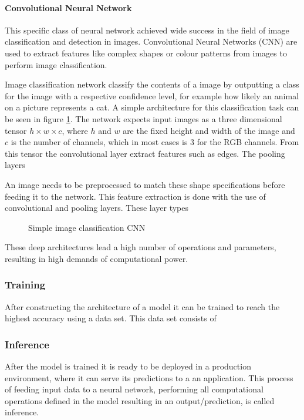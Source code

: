 \paragraph{Convolutional Neural Network}
This specific class of neural network achieved wide success in the field of image classification and detection in images. Convolutional Neural Networks (CNN) are used to extract features like complex shapes or colour patterns from images to perform image classification. 

Image classification network classify the contents of a image by outputting a class for the image with a respective confidence level, for example how likely an animal on a picture represents a cat.
A simple architecture for this classification task can be seen in figure \ref{fig:simpleCNN}.
The network expects input images as a three dimensional tensor $h\times w\times c$, where $h$ and $w$ are the fixed height and width of the image and $c$ is the number of channels, which in most cases is $3$ for the RGB channels.
From this tensor the convolutional layer extract features such as edges. 
The pooling layers 

An image needs to be preprocessed to match these shape specifications before feeding it to the network.
This feature extraction is done with the use of convolutional and pooling layers. These layer types



\begin{figure}
    \centering
    \resizebox{.95\linewidth}{!}{}
    \caption{Simple image classification CNN}
    \label{fig:simpleCNN}
\end{figure}
These deep architectures lead a high number of operations and parameters, resulting in high demands of computational power.
\subsubsection{Training}
After constructing the architecture of a model it can be trained to reach the highest accuracy using a data set. This data set consists of 
\subsubsection{Inference}

After the model is trained it is ready to be deployed in a production environment, where it can serve its predictions to a an application. This process of feeding input data to a neural network, performing all computational operations defined in the model resulting in an output/prediction, is called inference.

